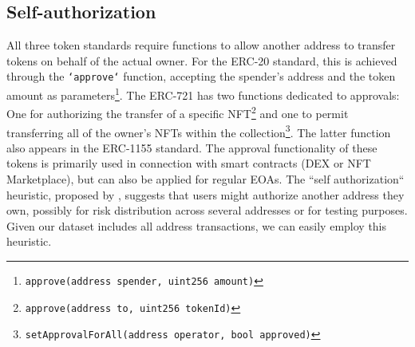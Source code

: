 \documentclass[12pt,a4paper,titlepage,oneside,english]{article}
\begin{document}
\subsection{Self-authorization} 
	All three token standards require functions to allow another address to transfer tokens on behalf of the actual owner. For the ERC-20 standard, this is achieved through the \texttt{`approve`} function, accepting the spender's address and the token amount as parameters\footnote{\texttt{approve(address spender, uint256 amount)}}. The ERC-721 has two functions dedicated to approvals: One for authorizing the transfer of a specific NFT\footnote{\texttt{approve(address to, uint256 tokenId)}} and one to permit transferring all of the owner's NFTs within the collection\footnote{\texttt{setApprovalForAll(address operator, bool approved)}}. The latter function also appears in the ERC-1155 standard. The approval functionality of these tokens is primarily used in connection with smart contracts (DEX or NFT Marketplace), but can also be applied for regular EOAs. \newline
The ``self authorization`` heuristic, proposed by \cite{FV:17}, suggests that users might authorize another address they own, possibly for risk distribution across several addresses or for testing purposes. \citep{FV:17} \newline
Given our dataset includes all address transactions, we can easily employ this heuristic. %


\iffalse
	For the ERC-20 standard: \texttt{approve(address spender, uint256 amount)}
	For the ERC-721 standard: \texttt{approve(address to, uint256 tokenId)} and \texttt{setApprovalForAll(address operator, bool approved)}\\
	For the ERC-1155 standard: \texttt{setApprovalForAll(address operator, bool approved)}
	
	- approve(address,uint256)
	- setApprovalForAll(address,bool) for both ERC-721 and ERC-1155
	
The first step is to get all approval transactions. We achieve this using the 'input'/calldata field. The first X bytes are always the function selector. We filter for the known function selectors for all standards. Next, we get the approved address/spender, also from the calldata, it is always at the same spot. We filter for spenders within the address set and for spenders who are different from the 'from' address. How many transactions are remaining? Finally, we extract all unique pairs of owners and spenders, disregarding the type of token or the amount.
\fi
\end{document}
